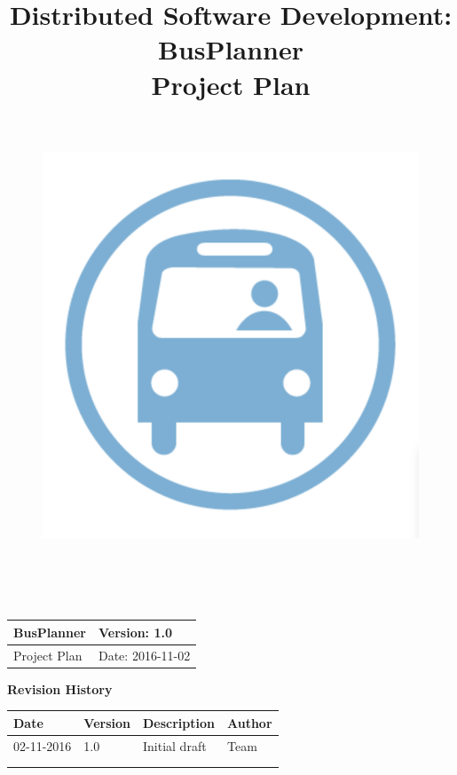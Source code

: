 \documentclass[a4paper, 12pt]{article}
\title{
	\textbf{D}istributed \textbf{S}oftware \textbf{D}evelopment: \textbf{BusPlanner}\\
	\textbf{Project Plan}\\
	\newline
	\begin{figure}[H]
		\centering
		\includegraphics[width=13cm, height=13cm]{Bus_logo}
	\end{figure}
\date{}
}
\begin{document}
	\begin{table}[t]
		\centering
		\begin{tabular}{| m{6cm} | m{6cm} |}
			\hline
			BusPlanner & Version: 1.0\\
			\hline
			Project Plan & Date: 2016-11-02\\
			\hline
		\end{tabular}
	\end{table}
	\maketitle
	\begin{center}
		\textbf{\Large Revision History}
	\end{center}
	\begin{table}[h]
		\centering
		\begin{tabular}{| m{3cm} | m{3cm} | m{3cm} | m{3cm} |}
			\hline
			\textbf{Date} & \textbf{Version} & \textbf{Description} & \textbf{Author}\\
			\hline
			02-11-2016 & 1.0 & Initial draft & Team\\
			\hline
			&&&\\
			\hline
			&&&\\
			\hline
		\end{tabular}
	\end{table}
\newpage
	\tableofcontents
	
	
	
	
	
	
	
\end{document}
